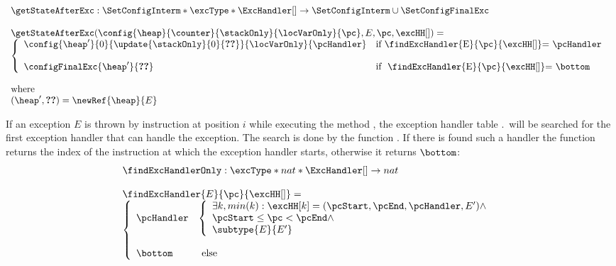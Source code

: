  
 $$\begin{array}{l}
          \getStateAfterExc : \SetConfigInterm * \excType * \ExcHandler[] \rightarrow \SetConfigInterm \cup \SetConfigFinalExc  \\
	  \\
	  \getStateAfterExc( \config{\heap}{\counter}{\stackOnly}{\locVarOnly}{\pc}, E, \pc, \excHH[] ) = \\
          \left\{\begin{array}{ll}
	        \config{\heap'}{0}{\update{\stackOnly}{0}{\Ref{E}}}{\locVarOnly}{\pcHandler} &  \mbox{\rm if \findExcHandler{E}{\pc}{\excHH[]}= \pcHandler } \\
		& \\
		\configFinalExc{\heap'}{\Ref{E}} &  \mbox{\rm  if \ \findExcHandler{E}{\pc}{\excHH[]}= } \bottom  \\
	  \end{array}\right.\\
	  \\
        \mbox{\rm where }\\
	(\heap', \Ref{E} )= \newRef{\heap}{E}
    \end{array}
 $$

 If an exception $E$ is thrown by instruction at position $i$ while executing the method \methodd,
 the exception handler table  \methodd.\excHandlerTable \ will be searched for the first exception handler that can handle the exception. 
 The search is done by the function \findExcHandlerOnly. If there is found
 such a handler the function returns the index of the instruction at which the exception handler starts, otherwise it returns $\bottom$:
 $$ \begin{array}{l}
        \findExcHandlerOnly : \excType * nat * \ExcHandler[] \rightarrow nat \\
	\\
	\findExcHandler{E}{\pc}{\excHH[]} = \\
	 \left\{\begin{array}{ll}
	     \pcHandler &  \left\{\begin{array}{l}
	                       \exists k,  min(k): \excHH[k] = (\pcStart,\pcEnd,\pcHandler, E' ) \wedge  \\
			       \pcStart \leq \pc < \pcEnd \wedge \\
			       \subtype{E}{E'}
			   \end{array}\right.	 \\
			   & \\
	     \bottom & \mbox{ \rm else} 
	 \end{array}\right.
   \end{array}	  
 $$

